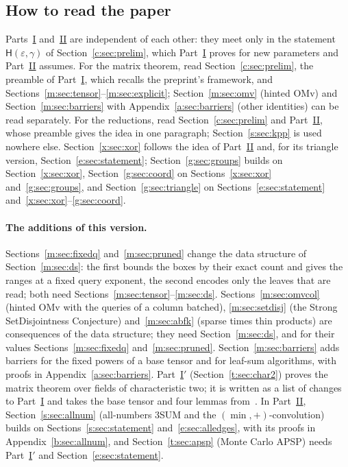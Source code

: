\documentclass[11pt]{article}
\theoremstyle{definition}
\theoremstyle{remark}
\newcommand{\Hyp}{\mathsf{H}}
\begin{document}
\subsection{How to read the paper}\label{m:sec:intro:guide}

Parts~\hyperref[m:partI]{I} and~\hyperref[m:partII]{II} are independent of each other: they meet only in the statement $\Hyp(\varepsilon,\gamma)$ of Section~\ref{c:sec:prelim}, which Part~\hyperref[m:partI]{I} proves for new parameters and Part~\hyperref[m:partII]{II} assumes. For the matrix theorem, read Section~\ref{c:sec:prelim}, the preamble of Part~\hyperref[m:partI]{I}, which recalls the preprint's framework, and Sections~\ref{m:sec:tensor}--\ref{m:sec:explicit}; Section~\ref{m:sec:omv} (hinted OMv) and Section~\ref{m:sec:barriers} with Appendix~\ref{a:sec:barriers} (other identities) can be read separately. For the reductions, read Section~\ref{c:sec:prelim} and Part~\hyperref[m:partII]{II}, whose preamble gives the idea in one paragraph; Section~\ref{s:sec:kpp} is used nowhere else. Section~\ref{x:sec:xor} follows the idea of Part~\hyperref[m:partII]{II} and, for its triangle version, Section~\ref{e:sec:statement}; Section~\ref{g:sec:groups} builds on Section~\ref{x:sec:xor}, Section~\ref{g:sec:coord} on Sections~\ref{x:sec:xor} and~\ref{g:sec:groups}, and Section~\ref{g:sec:triangle} on Sections~\ref{e:sec:statement} and~\ref{x:sec:xor}--\ref{g:sec:coord}.

\paragraph{The additions of this version.} Sections~\ref{m:sec:fixedq} and~\ref{m:sec:pruned} change the data structure of Section~\ref{m:sec:ds}: the first bounds the boxes by their exact count and gives the ranges at a fixed query exponent, the second encodes only the leaves that are read; both need Sections~\ref{m:sec:tensor}--\ref{m:sec:ds}. Sections~\ref{m:sec:omvcol} (hinted OMv with the queries of a column batched), \ref{m:sec:setdisj} (the Strong SetDisjointness Conjecture) and~\ref{m:sec:abfk} (sparse times thin products) are consequences of the data structure; they need Section~\ref{m:sec:ds}, and for their values Sections~\ref{m:sec:fixedq} and~\ref{m:sec:pruned}. Section~\ref{m:sec:barriers} adds barriers for the fixed powers of a base tensor and for leaf-sum algorithms, with proofs in Appendix~\ref{a:sec:barriers}. Part~\hyperref[t:partIp]{I$'$} (Section~\ref{t:sec:char2}) proves the matrix theorem over fields of characteristic two; it is written as a list of changes to Part~\hyperref[m:partI]{I} and takes the base tensor and four lemmas from~\cite{Maj26b}. In Part~\hyperref[m:partII]{II}, Section~\ref{s:sec:allnum} (all-numbers 3SUM and the $(\min,+)$-convolution) builds on Sections~\ref{s:sec:statement} and~\ref{e:sec:alledges}, with its proofs in Appendix~\ref{b:sec:allnum}, and Section~\ref{t:sec:apsp} (Monte Carlo APSP) needs Part~\hyperref[t:partIp]{I$'$} and Section~\ref{e:sec:statement}.
\end{document}
